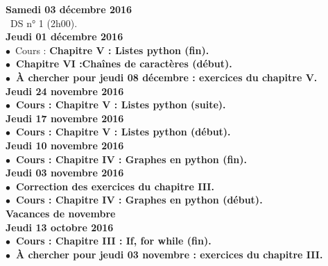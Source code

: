 \documentclass[12pt,a4paper]{article}
\begin{document}
\noindent\textbf{\bf Samedi 03 décembre 2016 \rm}\\
\bu\ DS n° 1 (2h00).\vspace{.4cm}\\

\noindent\textbf{\bf Jeudi 01 décembre 2016 \rm}\\
$\bullet$\ Cours : \bf Chapitre V \rm : Listes python (fin).\\
$\bullet$\ \bf Chapitre VI :\rm Chaînes de caractères (début).\\
$\bullet$\ À chercher pour jeudi 08 décembre : exercices du chapitre V.\vspace{.4cm}\\

\noindent\textbf{\bf Jeudi 24 novembre 2016 \rm}\\
$\bullet$\ Cours : \bf Chapitre V \rm : Listes python (suite).\vspace{.4cm}\\

\noindent\textbf{\bf Jeudi 17 novembre 2016 \rm}\\
$\bullet$\ Cours : \bf Chapitre V \rm : Listes python (début).\vspace{.4cm}\\

\noindent\textbf{\bf Jeudi 10 novembre 2016 \rm}\\
$\bullet$\ Cours : \bf Chapitre IV \rm : Graphes en python (fin).\vspace{.4cm}\\

\noindent\textbf{\bf Jeudi 03 novembre 2016 \rm}\\
$\bullet$\ Correction des exercices du chapitre III.\\
$\bullet$\ Cours : \bf Chapitre IV \rm : Graphes en python (début).\vspace{.4cm}\\

\noindent\textbf{ Vacances de novembre }\vspace{.4cm}\\

\noindent\textbf{\bf Jeudi 13 octobre 2016 \rm}\\
$\bullet$\ Cours : \bf Chapitre III \rm : If, for while (fin).\\
$\bullet$\ À chercher pour jeudi 03 novembre : exercices du chapitre III.\vspace{.4cm}\\
  
\end{document}
